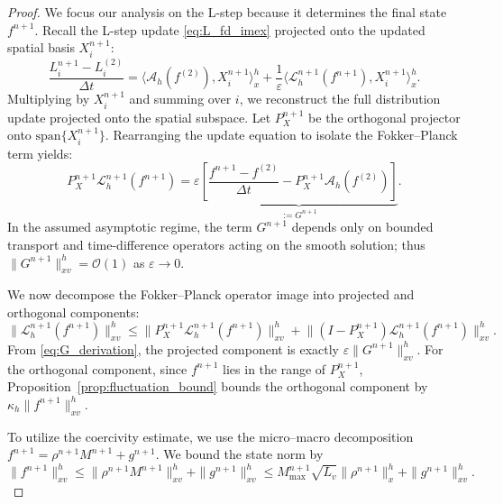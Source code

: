 \documentclass[]{article}
\numberwithin{equation}{section}
\begin{document}
\begin{proof}
We focus our analysis on the L-step because it determines the final state $f^{n+1}$. Recall the L-step update \eqref{eq:L_fd_imex} projected onto the updated spatial basis ${X}_i^{n+1}$:
\[
  \frac{L_i^{n+1} - L_i^{(2)}}{\Delta t} = \langle \mathcal{A}_h(f^{(2)}), {X}_i^{n+1} \rangle_x^h + \frac{1}{\varepsilon} \langle \mathcal{L}_{h}^{n+1}(f^{n+1}), {X}_i^{n+1} \rangle_x^h.
\]
Multiplying by ${X}_i^{n+1}$ and summing over $i$, we reconstruct the full distribution update projected onto the spatial subspace. Let $P_X^{n+1}$ be the orthogonal projector onto $\mathrm{span}\{{X}_i^{n+1}\}$. Rearranging the update equation to isolate the Fokker--Planck term yields:
\begin{equation}\label{eq:G_derivation}
  P_X^{n+1}\mathcal{L}_{h}^{n+1}(f^{n+1}) = \varepsilon \underbrace{\left[ \frac{f^{n+1} - f^{(2)}}{\Delta t} - P_X^{n+1}\mathcal{A}_h(f^{(2)}) \right]}_{:= G^{n+1}}.
\end{equation}
In the assumed asymptotic regime, the term $G^{n+1}$ depends only on bounded transport and time-difference operators acting on the smooth solution; thus $\|G^{n+1}\|_{xv}^h = \mathcal{O}(1)$ as $\varepsilon \to 0$.

We now decompose the Fokker--Planck operator image into projected and orthogonal components:
\[
  \big\|\mathcal L_{h}^{n+1}(f^{n+1})\big\|_{xv}^h \le \big\|P_X^{n+1}\mathcal L_{h}^{n+1}(f^{n+1})\big\|_{xv}^h + \big\|(I-P_X^{n+1})\mathcal L_{h}^{n+1}(f^{n+1})\big\|_{xv}^h.
\]
From \eqref{eq:G_derivation}, the projected component is exactly $\varepsilon \|G^{n+1}\|_{xv}^h$. For the orthogonal component, since $f^{n+1}$ lies in the range of $P_X^{n+1}$, Proposition~\ref{prop:fluctuation_bound} bounds the orthogonal component by $\kappa_h \|f^{n+1}\|_{xv}^h$.

To utilize the coercivity estimate, we use the micro--macro decomposition $f^{n+1} = \rho^{n+1} M^{n+1} + g^{n+1}$. We bound the state norm by
\[
  \|f^{n+1}\|_{xv}^h \le \|\rho^{n+1}M^{n+1}\|_{xv}^h + \|g^{n+1}\|_{xv}^h \le M_{\max}^{n+1}\sqrt{L_v}\|\rho^{n+1}\|_x^h + \|g^{n+1}\|_{xv}^h.
\]


\end{proof}
\end{document}

